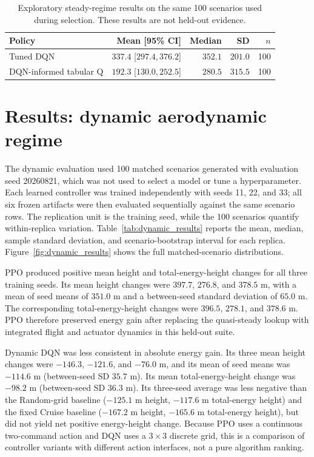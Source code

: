\documentclass{article}
\begin{document}
\begin{table}[t]
  \caption{Exploratory steady-regime results on the same 100 scenarios used
  during selection. These results are not held-out evidence.}
  \label{tab:exploratory}
  \centering
  \small
  \begin{tabular}{lrrrr}
    \toprule
    Policy & Mean [95\% CI] & Median & SD & $n$ \\
    \midrule
    Tuned DQN & $337.4$ [$297.4,376.2$] & $352.1$ & $201.0$ & 100 \\
    DQN-informed tabular Q & $192.3$ [$130.0,252.5$] & $280.5$ & $315.5$ & 100 \\
    \bottomrule
  \end{tabular}
\end{table}

\section{Results: dynamic aerodynamic regime}
\label{sec:dynamic_results}

The dynamic evaluation used 100 matched scenarios generated with evaluation
seed 20260821, which was not used to select a model or tune a hyperparameter.
Each learned controller was trained independently with seeds 11, 22, and 33;
all six frozen artifacts were then evaluated sequentially against the same
scenario rows.  The replication unit is the training seed, while the 100
scenarios quantify within-replica variation.  Table~\ref{tab:dynamic_results}
reports the mean, median, sample standard deviation, and scenario-bootstrap
interval for each replica.  Figure~\ref{fig:dynamic_results} shows the full
matched-scenario distributions.

PPO produced positive mean height and total-energy-height changes for all three
training seeds.  Its mean height changes were $397.7$, $276.8$, and $378.5$ m,
with a mean of seed means of $351.0$ m and a between-seed standard deviation of
$65.0$ m.  The corresponding total-energy-height changes were $396.5$,
$278.1$, and $378.6$ m.  PPO therefore preserved energy gain after replacing
the quasi-steady lookup with integrated flight and actuator dynamics in this
held-out suite.

Dynamic DQN was less consistent in absolute energy gain.  Its three mean
height changes were $-146.3$, $-121.6$, and $-76.0$ m, and its mean of seed
means was $-114.6$ m (between-seed SD $35.7$ m).  Its mean total-energy-height
change was $-98.2$ m (between-seed SD $36.3$ m).  Its three-seed average was
less negative than the Random-grid baseline ($-125.1$ m height, $-117.6$ m
total-energy height) and the fixed Cruise baseline ($-167.2$ m height,
$-165.6$ m total-energy height),
but did not yield net positive energy-height change.  Because PPO uses a
continuous two-command action and DQN uses a $3\times3$ discrete grid, this is
a comparison of controller variants with different action interfaces, not a
pure algorithm ranking.
\end{document}
